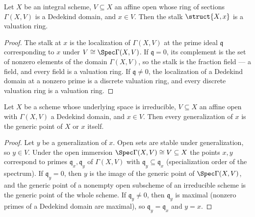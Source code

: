 \begin{theorem}
  \label{thm:affine_dedekind_stalk_valuation}
  \leanok
  Let \(X\) be an integral scheme, \(V \subseteq X\) an affine open whose ring of sections
  \(\Gamma(X, V)\) is a Dedekind domain, and \(x \in V\). Then the stalk
  \(\struct{X,x}\) is a valuation ring.
\end{theorem}
\begin{proof}
  \leanok
  The stalk at \(x\) is the localization of \(\Gamma(X, V)\) at the prime ideal
  \(\mathfrak q\) corresponding to \(x\) under \(V \cong \Spec \Gamma(X, V)\). If
  \(\mathfrak q = 0\), its complement is the set of nonzero elements of the domain
  \(\Gamma(X, V)\), so the stalk is the fraction field --- a field, and every field is a
  valuation ring. If \(\mathfrak q \neq 0\), the localization of a Dedekind domain at a
  nonzero prime is a discrete valuation ring, and every discrete valuation ring is a
  valuation ring.
\end{proof}

\begin{theorem}
  \label{thm:affine_dedekind_specializes}
  \leanok
  Let \(X\) be a scheme whose underlying space is irreducible, \(V \subseteq X\) an affine
  open with \(\Gamma(X, V)\) a Dedekind domain, and \(x \in V\). Then every generalization
  of \(x\) is the generic point of \(X\) or \(x\) itself.
\end{theorem}
\begin{proof}
  \leanok
  Let \(y\) be a generalization of \(x\). Open sets are stable under generalization, so
  \(y \in V\). Under the open immersion \(\Spec \Gamma(X, V) \cong V \subseteq X\) the
  points \(x, y\) correspond to primes \(\mathfrak q_x, \mathfrak q_y\) of
  \(\Gamma(X, V)\) with \(\mathfrak q_y \subseteq \mathfrak q_x\) (specialization order of
  the spectrum). If \(\mathfrak q_y = 0\), then \(y\) is the image of the generic point of
  \(\Spec \Gamma(X, V)\), and the generic point of a nonempty open subscheme of an
  irreducible scheme is the generic point of the whole scheme. If \(\mathfrak q_y \neq 0\),
  then \(\mathfrak q_y\) is maximal (nonzero primes of a Dedekind domain are maximal), so
  \(\mathfrak q_y = \mathfrak q_x\) and \(y = x\).
\end{proof}

